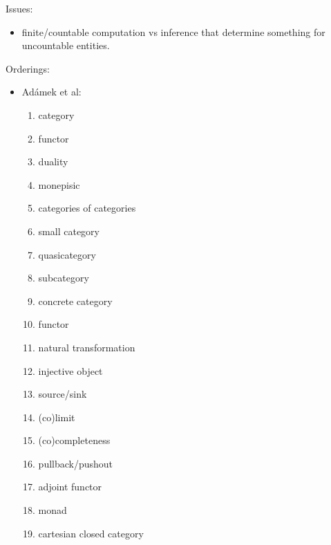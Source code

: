 \documentclass[11pt,openany]{book}
\begin{document}
Issues: 
\begin{itemize}
  \item finite/countable computation vs inference that determine
something for uncountable entities.
  \end{itemize}

\setcounter{currentlevel}{\value{baseSectionLevel}}
\label{sec:Key-ideas}

Orderings:
\begin{itemize}
 
\item Ad\'{a}mek et al:~\cite{adamek_herrlich_strecker_1990}
\begin{enumerate}
  \item category 
  \item functor
  \item duality
  \item monepisic
  \item categories of categories 
  \item small category
  \item quasicategory
  \item subcategory
  \item concrete category
  \item functor
  \item natural transformation
  \item injective object
  \item source/sink
  \item (co)limit
  \item (co)completeness
  \item pullback/pushout
  \item adjoint functor
  \item monad
  \item cartesian closed category
\end{enumerate}


\end{itemize}
\end{document}
